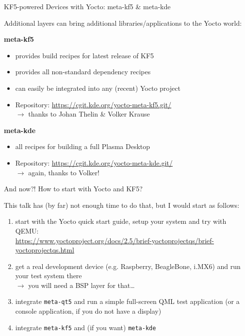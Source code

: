 \documentclass[ucs,9pt]{beamer}
\begin{document}
\begin{frame}
    {KF5-powered Devices with Yocto: meta-kf5 \& meta-kde}

    Additional layers can bring additional libraries/applications to the Yocto world:
    \medskip

    \textbf{meta-kf5}
    \begin{itemize}
        \item provides build recipes for latest release of KF5
        \item provides all non-standard dependency recipes
        \item can easily be integrated into any (recent) Yocto project
        \item Repository: \url{https://cgit.kde.org/yocto-meta-kf5.git/}\\
            $\rightarrow$ thanks to Johan Thelin \& Volker Krause
    \end{itemize}

    \textbf{meta-kde}
    \begin{itemize}
        \item all recipes for building a full Plasma Desktop
        \item Repository: \url{https://cgit.kde.org/yocto-meta-kde.git/}\\
            $\rightarrow$ again, thanks to Volker!
    \end{itemize}
\end{frame}

\begin{frame}
    {And now?!}
    {How to start with Yocto and KF5?}

    This talk has (by far) not enough time to do that, but I would start as follows:

    \begin{enumerate}
        \item start with the Yocto quick start guide, setup your system and try with QEMU:\\
            \url{https://www.yoctoproject.org/docs/2.5/brief-yoctoprojectqs/brief-yoctoprojectqs.html}
        \item get a real development device (e.g. Raspberry, BeagleBone, i.MX6) and run your test system there\\
            $\rightarrow$ you will need a BSP layer for that\dots
        \item integrate \texttt{meta-qt5} and run a simple full-screen QML test application (or a console application, if you do not have a display)
        \item integrate \texttt{meta-kf5} and (if you want) \texttt{meta-kde}
    \end{enumerate}

\end{frame}
\end{document}
